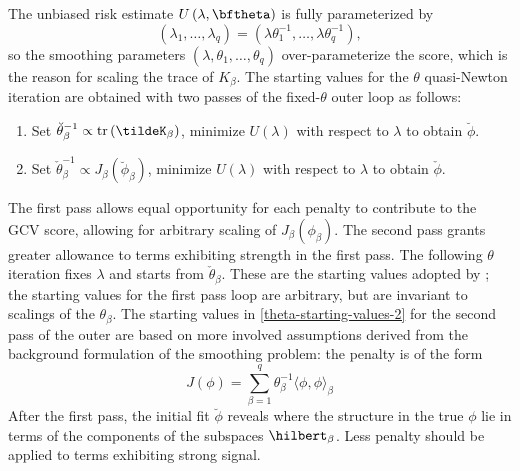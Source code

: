 \bigskip

The unbiased risk estimate $U\left(\lambda, \bftheta\right)$ is fully parameterized by 
\begin{equation}
\left(\lambda_1, \dots, \lambda_q\right) = \left(\lambda \theta^{-1}_1, \dots, \lambda \theta^{-1}_q\right),
\end{equation}
\noindent
so the smoothing parameters $\left(\lambda, \theta_1, \dots, \theta_q\right)$ over-parameterize the score, which is the reason for scaling the trace of $K_\beta$. The starting values for the $\theta$ quasi-Newton iteration are obtained with two passes of the fixed-$\theta$ outer loop as follows:
\begin{enumerate}
\item Set $\breve{\theta}_\beta^{-1} \propto \mbox{tr}\left( \tildeK_\beta \right)$, minimize $U\left(\lambda\right)$ with respect to $\lambda$ to obtain $\breve{\phi}$. \label{theta-starting-values-1}
\item Set $\check{\theta}_\beta^{-1} \propto  J_\beta\left(\breve{\phi}_\beta \right)$, minimize $U\left(\lambda\right)$ with respect to $\lambda$ to obtain $\check{\phi}$. \label{theta-starting-values-2}
\end{enumerate}
\noindent
The first pass allows equal opportunity for each penalty to contribute to the GCV score, allowing for arbitrary scaling of $J_\beta \left(\phi_\beta\right)$. The second pass grants greater allowance to terms exhibiting strength in the first pass. The following $\theta$ iteration fixes $\lambda$ and starts from $\check{\theta}_\beta$. These are the starting values adopted by \cite{gu1991minimizing}; the starting values for the first pass loop are arbitrary, but are invariant to scalings of the $\theta_\beta$. The starting values in \ref{theta-starting-values-2} for the second pass of the outer are based on more involved assumptions derived from the background formulation of the smoothing problem: the penalty is of the form
\[
J\left(\phi\right)= \sum_{\beta = 1}^q \theta^{-1}_\beta \langle \phi, \phi\rangle_\beta
\]
\noindent
After the first pass, the initial fit $\breve{\phi}$ reveals where the structure in the true $\phi$ lie in terms of the components of the subspaces $\hilbert_\beta$. Less penalty should be applied to terms exhibiting strong signal.  


